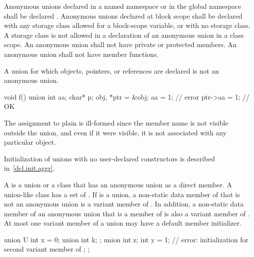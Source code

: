 \pnum
{}%
%
Anonymous unions declared in a named namespace or in the global
namespace shall be declared . Anonymous unions declared at
block scope shall be declared with any storage class allowed for a
block-scope variable, or with no storage class. A storage class is not
allowed in a declaration of an anonymous union in a class scope.
%
%
An anonymous union shall not have private or protected
members. An anonymous union shall not have
member functions.

\pnum
A union for which objects, pointers, or references are declared is not an anonymous union.
\begin{example}

\begin{codeblock}
void f() {
  union { int aa; char* p; } obj, *ptr = &obj;
  aa = 1;           // error
  ptr->aa = 1;      // OK
}
\end{codeblock}

The assignment to plain  is ill-formed since the member name
is not visible outside the union, and even if it were visible, it is not
associated with any particular object.
\end{example}
\begin{note}
Initialization of unions with no user-declared constructors is described
in~\ref{dcl.init.aggr}.
\end{note}

\pnum
{}%
%
A  is a union or a class that has an anonymous union as a direct
member. A union-like class  has a set of .
If  is a union, a non-static data member of  that is not an anonymous
union is a variant member of . In addition, a non-static data member of an
anonymous union that is a member of  is also a variant member of .
At most one variant member of a union may have a default member initializer.
\begin{example}
\begin{codeblock}
union U {
  int x = 0;
  union {
    int k;
  };
  union {
    int z;
    int y = 1;      // error: initialization for second variant member of 
  };
};
\end{codeblock}
\end{example}

